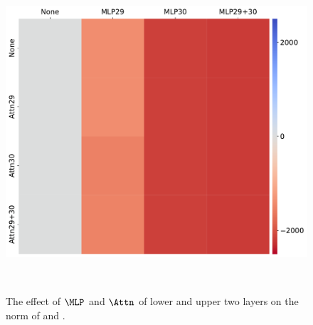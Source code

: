 \begin{figure}[t]
    \begin{minipage}{0.24\textwidth}
      \centering
      \label{fig:appendix-ablation-delim-lower}
      \vspace{-.2em}
      \includegraphics[width=\linewidth]{Figures/figures_circuit/interventions/delim_upper.pdf}
  \end{minipage}~
  
  \caption{\small The effect of $\MLP$ and $\Attn$ of lower and upper two layers on the norm of \bos and \delim.}
  \label{figure:appendix-ablation-massive-sup-control}
\end{figure}


